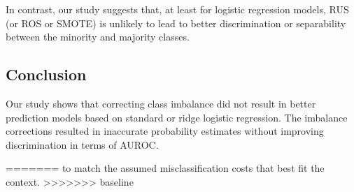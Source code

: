 	In contrast, our study suggests that, at least for logistic regression models, 
	RUS (or ROS or SMOTE) is unlikely to lead to better discrimination or separability between the minority and majority classes.
	
\subsection{Conclusion}	
	Our study shows that correcting class imbalance did not result in better prediction models based on standard or ridge logistic regression. 
	The imbalance corrections resulted in inaccurate probability estimates without improving discrimination in terms of AUROC.
	
	
=======
	to match the assumed misclassification costs that best fit the context.
>>>>>>> baseline
